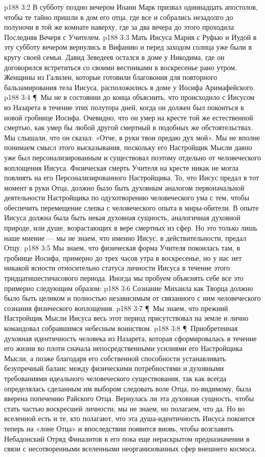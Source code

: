 \vs p188 3:2 В субботу поздно вечером Иоанн Марк призвал одиннадцать апостолов, чтобы те тайно пришли в дом его отца, где все и собрались незадолго до полуночи в той же комнате наверху, где за два вечера до этого проходила Последняя Вечеря с Учителем.
\vs p188 3:3 Мать Иисуса Мария с Руфью и Иудой в эту субботу вечером вернулись в Вифанию и перед заходом солнца уже были в кругу своей семьи. Давид Зеведеев остался в доме у Никодима, где он договорился встретиться со своими вестниками в воскресенье рано утром. Женщины из Галилеи, которые готовили благовония для повторного бальзамирования тела Иисуса, расположились в доме у Иосифа Аримафейского.
\vs p188 3:4 \P\ Мы не в состоянии до конца объяснить, что происходило с Иисусом из Назарета в течение этих полутора дней, когда он должен был покоиться в новой гробнице Иосифа. Очевидно, что он умер на кресте той же естественной смертью, как умер бы любой другой смертный в подобных же обстоятельствах. Мы слышали, что он сказал: «Отче, в руки твои предаю дух мой». Мы не вполне понимаем смысл этого высказывания, поскольку его Настройщик Мысли давно уже был персонализированным и существовал поэтому отдельно от человеческого воплощения Иисуса. Физическая смерть Учителя на кресте никак не могла повлиять на его Персонализированного Настройщика. То, что Иисус предал в тот момент в руки Отца, должно было быть духовным аналогом первоначальной деятельности Настройщика по одухотворению человеческого ума с тем, чтобы обеспечить перемещение слепка с человеческого опыта в миры\hyp{}обители. В опыте Иисуса должна была быть некая духовная сущность, аналогичная духовной природе, или душе, возрастающих в вере смертных из сфер. Но это только лишь наше мнение --- мы не знаем, что именно Иисус, в действительности, предал Отцу.
\vs p188 3:5 Мы знаем, что физическая форма Учителя покоилась там, в гробнице Иосифа, примерно до трех часов утра в воскресенье, но у нас нет никакой ясности относительно статуса личности Иисуса в течение этого тридцатишестичасового периода. Иногда мы пробуем объяснять себе все это примерно следующим образом:
\vs p188 3:6 \bibnobreakspace Сознание Михаила как Творца должно было быть целиком и полностью независимым от связанного с ним человеческого сознания физического воплощения.
\vs p188 3:7 \P\ \bibnobreakspace Мы знаем, что прежний Настройщик Мысли Иисуса весь этот период присутствовал на земле и лично командовал собравшимся небесным воинством.
\vs p188 3:8 \P\ \bibnobreakspace Приобретенная духовная идентичность человека из Назарета, которая сформировалась в течение его жизни во плоти сначала непосредственными усилиями его Настройщика Мысли, а позже благодаря его собственной способности устанавливать безупречный баланс между физическими потребностями и духовными требованиями идеального человеческого существования, так как всегда определялась сделанным им выбором следовать воле Отца, по\hyp{}видимому, была вверена попечению Райского Отца. Вернулась ли эта духовная сущность, чтобы стать частью воскресшей личности, мы не знаем, но полагаем, что да. Но во вселенной есть и те, кто полагают, что эта душа\hyp{}идентичность Иисуса покоится теперь на «лоне Отца» и впоследствии появится вновь, чтобы возглавить Небадонский Отряд Финалитов в его пока еще нераскрытом предназначении в связи с несотворенными вселенными неорганизованных сфер внешнего космоса.
